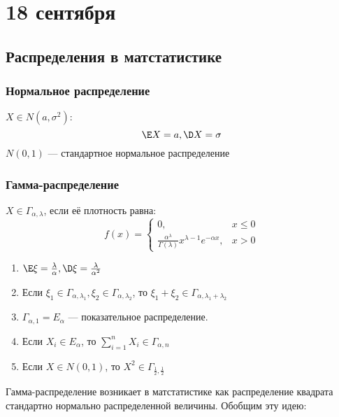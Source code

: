 \chapter{18 сентября}

\section{Распределения в матстатистике}

\setcounter{subsection}{-1}

\subsection{Нормальное распределение}

\(X \in N(a, \sigma^2)\):
\[\E X = a, \D X = \sigma\]
\(N(0, 1)\) --- стандартное нормальное распределение

\subsection{Гамма-распределение}

\(X \in \Gamma_{\alpha, \lambda}\), если её плотность равна:
\[f(x) = \begin{cases}
        0,                                                                     & x \leq 0 \\
        \frac{\alpha^\lambda}{\Gamma(\lambda)} x^{\lambda - 1} e^{ -\alpha x}, & x > 0
    \end{cases}\]

\begin{prop}\itemfix
    \begin{enumerate}
        \item \(\E \xi = \frac{\lambda}{\alpha}, \D \xi = \frac{\lambda}{\alpha^2}\)
        \item Если \(\xi_1 \in \Gamma_{\alpha, \lambda_1}, \xi_2 \in \Gamma_{\alpha, \lambda_2}\), то \(\xi_1 + \xi_2 \in \Gamma_{\alpha, \lambda_1 + \lambda_2}\)
        \item \(\Gamma_{\alpha, 1} = E_\alpha\) --- показательное распределение.
        \item Если \(X_i \in E_\alpha\), то \(\sum_{i=1}^{n} X_i \in \Gamma_{\alpha, n}\)
        \item Если \(X \in N(0, 1)\), то \(X^2 \in \Gamma_{\frac{1}{2},\frac{1}{2}}\)
    \end{enumerate}
\end{prop}

\begin{remark}
    Гамма-распределение возникает в матстатистике как распределение квадрата стандартно нормально распределенной величины. Обобщим эту идею:
\end{remark}

